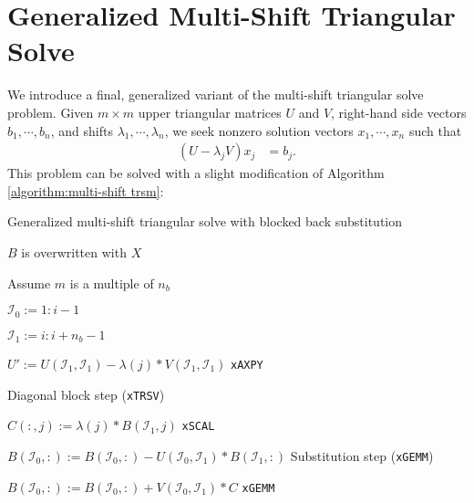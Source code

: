 \documentclass{article}
\begin{document}
\section{Generalized Multi-Shift Triangular Solve}
We introduce a final, generalized variant of the multi-shift
triangular solve problem. Given \(m\times m\) upper triangular
matrices \(U\) and \(V\), right-hand side vectors \(b_1,\cdots,b_n\),
and shifts \(\lambda_1,\cdots,\lambda_n\), we seek nonzero solution
vectors \(x_1,\cdots,x_n\) such that
\begin{align}
  \left( U - \lambda_j V \right) x_j &= b_j .
\end{align}
This problem can be solved with a slight modification of Algorithm
\ref{algorithm:multi-shift trsm}:
\begin{algorithm}[H]
  \label{algorithm:generalized multi-shift trsm}
  \caption{Generalized multi-shift triangular solve with blocked back substitution}
  \begin{algorithmic}
    \Comment \(B\) is overwritten with \(X\)

     \Comment Assume \(m\) is a multiple of
    \(n_b\)

    \State \( \mathcal{I}_0 := 1:i-1 \)

    \State \( \mathcal{I}_1 := i:i+n_b-1\)
    

    \State \(U' := U(\mathcal{I}_1,\mathcal{I}_1)-\lambda(j) * V(\mathcal{I}_1,\mathcal{I}_1)\) \Comment \texttt{xAXPY}

    \State {} 
    \Comment Diagonal block step (\texttt{xTRSV})

    \State \( C(:,j) := \lambda(j) * B(\mathcal{I}_1,j)\) \Comment \texttt{xSCAL}

    \EndFor

    \State \( B(\mathcal{I}_0,:) := B(\mathcal{I}_0,:) - U(\mathcal{I}_0,\mathcal{I}_1) * B(\mathcal{I}_1,:) \)
    \Comment Substitution step (\texttt{xGEMM})

    \State \( B(\mathcal{I}_0,:) := B(\mathcal{I}_0,:) + V(\mathcal{I}_0,\mathcal{I}_1)* C \) \Comment \texttt{xGEMM}

    \EndFor

    \EndProcedure
  \end{algorithmic}
\end{algorithm}
\noindent
\end{document}
